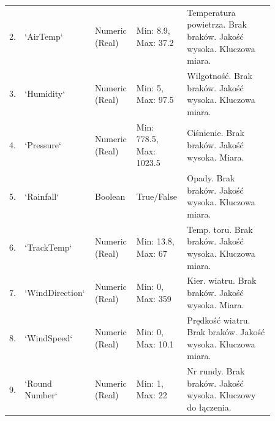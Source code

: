 \documentclass[a4paper,12pt]{article}
\begin{document}
\begin{longtable}{|p{0.03\linewidth}|p{0.18\linewidth}|p{0.15\linewidth}|p{0.18\linewidth}|p{0.32\linewidth}|}
  \tiny 2.          & \tiny `AirTemp`                                      & \tiny Numeric (Real)                                                                        & \tiny Min: 8.9, Max: 37.2     & \tiny Temperatura powietrza. Brak braków. Jakość wysoka. Kluczowa miara.                                           \\
  \tiny 3.          & \tiny `Humidity`                                     & \tiny Numeric (Real)                                                                        & \tiny Min: 5, Max: 97.5       & \tiny Wilgotność. Brak braków. Jakość wysoka. Kluczowa miara.                                                      \\
  \tiny 4.          & \tiny `Pressure`                                     & \tiny Numeric (Real)                                                                        & \tiny Min: 778.5, Max: 1023.5 & \tiny Ciśnienie. Brak braków. Jakość wysoka. Miara.                                                                \\
  \tiny 5.          & \tiny `Rainfall`                                     & \tiny Boolean                                                                               & \tiny True/False              & \tiny Opady. Brak braków. Jakość wysoka. Kluczowa miara.                                                           \\
  \tiny 6.          & \tiny `TrackTemp`                                    & \tiny Numeric (Real)                                                                        & \tiny Min: 13.8, Max: 67      & \tiny Temp. toru. Brak braków. Jakość wysoka. Kluczowa miara.                                                      \\
  \tiny 7.          & \tiny `WindDirection`                                & \tiny Numeric (Real)                                                                        & \tiny Min: 0, Max: 359        & \tiny Kier. wiatru. Brak braków. Jakość wysoka. Miara.                                                             \\
  \tiny 8.          & \tiny `WindSpeed`                                    & \tiny Numeric (Real)                                                                        & \tiny Min: 0, Max: 10.1       & \tiny Prędkość wiatru. Brak braków. Jakość wysoka. Kluczowa miara.                                                 \\
  \tiny 9.          & \tiny `Round Number`                                 & \tiny Numeric (Real)                                                                        & \tiny Min: 1, Max: 22         & \tiny Nr rundy. Brak braków. Jakość wysoka. Kluczowy do łączenia.                                                  \\

\end{longtable}
\end{document}
